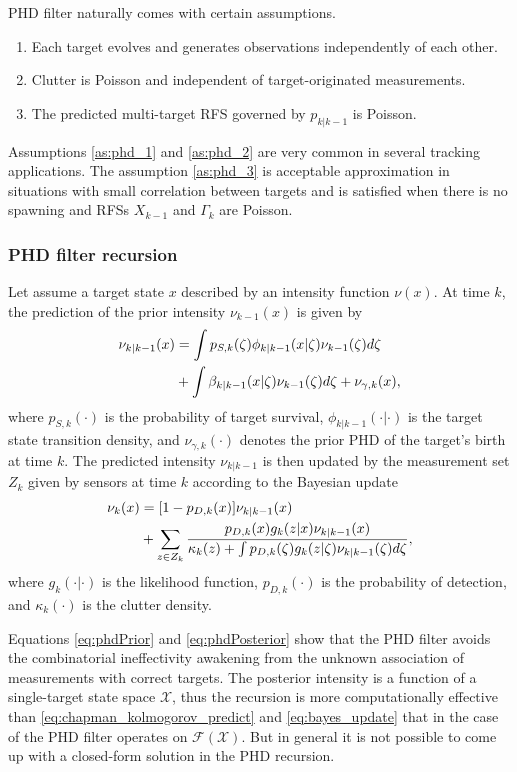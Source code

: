 PHD filter naturally comes with certain assumptions.
\begin{enumerate}
    \item Each target evolves and generates observations independently of each other. \label{as:phd_1}
    \item Clutter is Poisson and independent of target-originated measurements. \label{as:phd_2}
    \item The predicted multi-target RFS governed by $p_{k|k-1}$ is Poisson. \label{as:phd_3}
\end{enumerate}

Assumptions \ref{as:phd_1} and \ref{as:phd_2} are very common in several tracking applications. The assumption \ref{as:phd_3} is acceptable approximation in situations with small correlation between targets and is satisfied when
there is no spawning and RFSs $X_{k-1}$ and $\Gamma_k$ are Poisson.

            \subsubsection{PHD filter recursion}
Let assume a target state $x$ described by an intensity function $\nu(x)$. At time $k$, the prediction of the prior intensity $\nu_{k-1}(x)$ is given by
\begin{align}
    \nu_{k|k-1}(x) &= \int p_{S,k}(\zeta)\phi_{k|k-1}(x|\zeta)\nu_{k-1}(\zeta)d\zeta \notag \\
        &+ \int \beta_{k|k-1}(x|\zeta) \nu_{k-1}(\zeta)d\zeta + \nu_{\gamma,k}(x),
    \label{eq:phdPrior}
\end{align}
where $p_{S,k}(\cdot)$ is the probability of target survival, $\phi_{k|k-1}(\cdot|\cdot)$ is the target state
transition density, and $\nu_{\gamma,k}(\cdot)$ denotes the prior PHD of the target's birth at time $k$.
The predicted intensity $\nu_{k|k-1}$ is then updated by the measurement set $Z_k$ given by sensors at time $k$ according to the Bayesian update
\begin{align}
        \nu_k(x) &= [1 - p_{D,k}(x)]\nu_{k|k-1}(x) \notag \\
        &+ \sum_{z \in Z_k}\frac{p_{D,k}(x) g_k(z|x) \nu_{k|k-1}(x)}{\kappa_k(z) + \int p_{D,k}(\zeta) g_k(z|\zeta) \nu_{k|k-1}(\zeta)d\zeta}, \label{eq:phdPosterior}
\end{align}
where $g_k(\cdot|\cdot)$ is the likelihood function, $p_{D,k}(\cdot)$ is the probability of detection, and $\kappa_k(\cdot)$ is the clutter density.

Equations \eqref{eq:phdPrior} and \eqref{eq:phdPosterior} show that the PHD filter avoids the combinatorial
ineffectivity awakening from the unknown association of measurements with correct targets. The posterior intensity is
a function of a single-target state space $\mathcal{X}$, thus the recursion is more computationally effective than \eqref{eq:chapman_kolmogorov_predict} and \eqref{eq:bayes_update} that in the case of the PHD filter operates on $\mathcal{F(X)}$. But in general it is not possible to come up with a closed-form solution in the PHD recursion.

